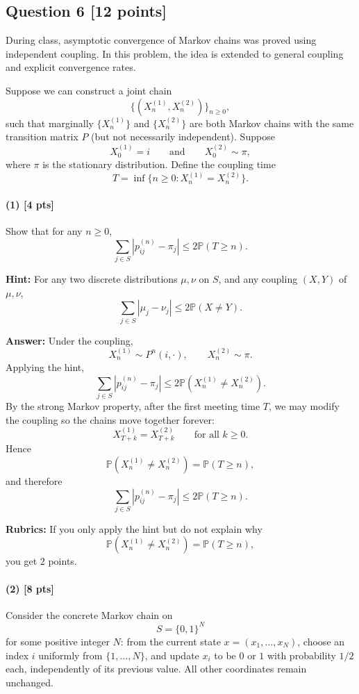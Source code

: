 \documentclass[11pt]{article}
\theoremstyle{definition}
\begin{document}
\subsection*{Question 6 \hfill [12 points]}

During class, asymptotic convergence of Markov chains was proved using independent coupling. In this problem, the idea is extended to general coupling and explicit convergence rates.

Suppose we can construct a joint chain
\[
\{(X_n^{(1)},X_n^{(2)})\}_{n\ge 0},
\]
such that marginally \(\{X_n^{(1)}\}\) and \(\{X_n^{(2)}\}\) are both Markov chains with the same transition matrix \(P\) (but not necessarily independent). Suppose
\[
X_0^{(1)}=i
\qquad \text{and} \qquad
X_0^{(2)}\sim \pi,
\]
where \(\pi\) is the stationary distribution. Define the coupling time
\[
T=\inf\{n\ge 0:X_n^{(1)}=X_n^{(2)}\}.
\]

\paragraph{(1) \hfill [4 pts]}
Show that for any \(n\ge 0\),
\[
\sum_{j\in S}|p_{ij}^{(n)}-\pi_j|\le 2\mathbb P(T\ge n).
\]

\textbf{Hint:} For any two discrete distributions \(\mu,\nu\) on \(S\), and any coupling \((X,Y)\) of \(\mu,\nu\),
\[
\sum_{j\in S}|\mu_j-\nu_j|\le 2\mathbb P(X\ne Y).
\]

\textbf{Answer:}
Under the coupling,
\[
X_n^{(1)}\sim P^n(i,\cdot),
\qquad
X_n^{(2)}\sim \pi.
\]
Applying the hint,
\[
\sum_{j\in S}|p_{ij}^{(n)}-\pi_j|
\le
2\mathbb P(X_n^{(1)}\ne X_n^{(2)}).
\]
By the strong Markov property, after the first meeting time \(T\), we may modify the coupling so the chains move together forever:
\[
X_{T+k}^{(1)}=X_{T+k}^{(2)}
\qquad \text{for all } k\ge 0.
\]
Hence
\[
\mathbb P(X_n^{(1)}\ne X_n^{(2)})=\mathbb P(T\ge n),
\]
and therefore
\[
\sum_{j\in S}|p_{ij}^{(n)}-\pi_j|\le 2\mathbb P(T\ge n).
\]

\textbf{Rubrics:}
If you only apply the hint but do not explain why
\[
\mathbb P(X_n^{(1)}\ne X_n^{(2)})=\mathbb P(T\ge n),
\]
you get \(2\) points.

\paragraph{(2) \hfill [8 pts]}
Consider the concrete Markov chain on
\[
S=\{0,1\}^N
\]
for some positive integer \(N\): from the current state \(x=(x_1,\dots,x_N)\), choose an index \(i\) uniformly from \(\{1,\dots,N\}\), and update \(x_i\) to be \(0\) or \(1\) with probability \(1/2\) each, independently of its previous value. All other coordinates remain unchanged.
\end{document}
